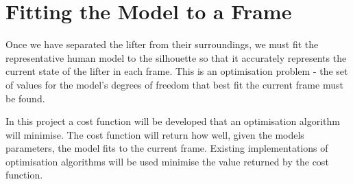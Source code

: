 \section{Fitting the Model to a Frame}

Once we have separated the lifter from their surroundings, we must fit the representative human model to the silhouette so that it accurately represents the current state of the lifter in each frame. This is an optimisation problem - the set of values for the model's degrees of freedom that best fit the current frame must be found.

In this project a cost function will be developed that an optimisation algorithm will minimise. The cost function will return how well, given the models parameters, the model fits to the current frame. Existing implementations of optimisation algorithms will be used minimise the value returned by the cost function.